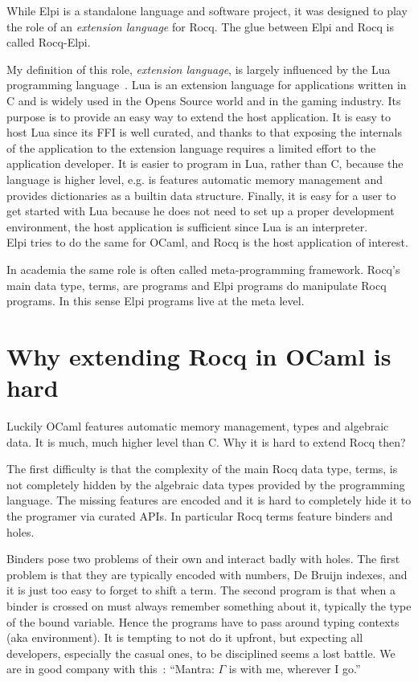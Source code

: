 \documentclass[a4paper, 11pt]{book}
\begin{document}
While Elpi is a standalone language and software project, it was designed to
play the role of an \emph{extension language} for Rocq. The glue between Elpi and
Rocq is called Rocq-Elpi.

My definition of this role, \emph{extension language}, is largely influenced
by the Lua programming language~\cite{10.5555/1200583}. Lua is an extension
language for applications written in C and is widely used in the Opens Source
world and in the gaming industry.
Its purpose is to provide an easy way to extend the host application.
It is easy to host Lua since its FFI is well curated, and thanks to that
exposing the internals of the application to the extension language requires a
limited effort to the application developer. It is easier to program in Lua,
rather than C, because the language is higher level, e.g. is features automatic
memory management and provides dictionaries as a builtin data structure.
Finally, it is easy for a user to get started with Lua because he does not need
to set up a proper development environment, the host application is sufficient
since Lua is an interpreter.\\
Elpi tries to do the same for OCaml, and Rocq is the host application of interest.

In academia the same role is often called meta-programming framework.
Rocq's main data type, terms, are programs and Elpi
programs do manipulate Rocq programs. In this sense Elpi programs live at the
meta level.

\section{Why extending Rocq in OCaml is hard}

Luckily OCaml features automatic memory management, types and algebraic data.
It is much, much higher level than C. Why it is hard to extend Rocq then?

The first difficulty is that the complexity of the main Rocq data type, terms,
is not completely hidden by the algebraic data types provided by the programming
language. The missing features are encoded and it is hard to completely hide
it to the programer via curated APIs. In particular Rocq terms feature binders
and holes. 

Binders pose two problems of their own and interact badly with holes.
The first problem is that they are typically encoded with numbers, De Bruijn
indexes, and it is just too easy to forget to shift a term.  The second program
is that when a binder is crossed on must always remember something about it,
typically the type of the bound variable. Hence the programs have to pass around
typing contexts (aka environment). It is tempting to not do it upfront, but
expecting all developers, especially the casual ones, to be disciplined seems
a lost battle. We are in good company with this~\cite[page 20]{mcbride}:
``Mantra: $\Gamma$ is with me, wherever I go.''
\end{document}
